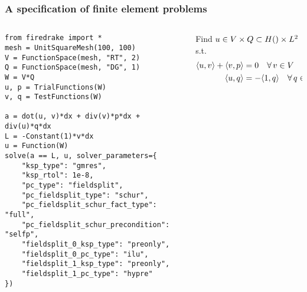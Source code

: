 \documentclass[presentation]{beamer}
\let\div\relax
\DeclareMathOperator{\div}{div}
\newcommand{\inner}[2]{\ensuremath{\langle #1, #2 \rangle}}
\begin{document}
\begin{frame}[fragile]
  \frametitle{A specification of finite element problems}
  \begin{columns}
    \begin{column}[t]{0.65\textwidth}
\begin{verbatim}
from firedrake import *
mesh = UnitSquareMesh(100, 100)
V = FunctionSpace(mesh, "RT", 2)
Q = FunctionSpace(mesh, "DG", 1)
W = V*Q
u, p = TrialFunctions(W)
v, q = TestFunctions(W)

a = dot(u, v)*dx + div(v)*p*dx + div(u)*q*dx
L = -Constant(1)*v*dx
u = Function(W)
solve(a == L, u, solver_parameters={
    "ksp_type": "gmres", 
    "ksp_rtol": 1e-8,
    "pc_type": "fieldsplit",
    "pc_fieldsplit_type": "schur",
    "pc_fieldsplit_schur_fact_type": "full",
    "pc_fieldsplit_schur_precondition": "selfp",
    "fieldsplit_0_ksp_type": "preonly",
    "fieldsplit_0_pc_type": "ilu",
    "fieldsplit_1_ksp_type": "preonly",
    "fieldsplit_1_pc_type": "hypre"
})
\end{verbatim}
    \end{column}
    \hspace{-4em}
    \begin{column}[t]{0.5\textwidth}
      Find $u\in V\times Q\subset H(\div)\times L^2$ s.t.
      \begin{align*}
        \inner{u}{v} + \inner{\div v}{p} &= 0 \quad\forall\, v \in V\\
        \inner{\div u}{q} &= -\inner{1}{q}\quad\forall\, q \in Q.
      \end{align*}
    \end{column}
  \end{columns}
\end{frame}
\end{document}
